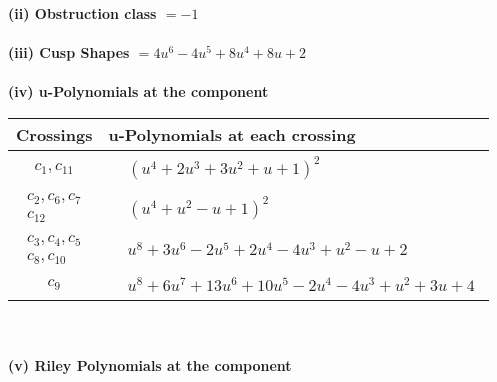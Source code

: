 \documentclass[1p]{elsarticle_modified}
\theoremstyle{definition}
\begin{document}
\flushleft \textbf{(ii) Obstruction class $= -1$}\\~\\
\flushleft \textbf{(iii) Cusp Shapes $= 4 u^6-4 u^5+8 u^4+8 u+2$}\\~\\
\newpage\renewcommand{\arraystretch}{1}
\flushleft \textbf{(iv) u-Polynomials at the component}\newline \\
\begin{tabular}{m{50pt}|m{274pt}}
Crossings & \hspace{64pt}u-Polynomials at each crossing \\
\hline $$\begin{aligned}c_{1},c_{11}\end{aligned}$$&$\begin{aligned}
&(u^4+2 u^3+3 u^2+u+1)^2
\end{aligned}$\\
\hline $$\begin{aligned}c_{2},c_{6},c_{7}\\c_{12}\end{aligned}$$&$\begin{aligned}
&(u^4+u^2- u+1)^2
\end{aligned}$\\
\hline $$\begin{aligned}c_{3},c_{4},c_{5}\\c_{8},c_{10}\end{aligned}$$&$\begin{aligned}
&u^8+3 u^6-2 u^5+2 u^4-4 u^3+u^2- u+2
\end{aligned}$\\
\hline $$\begin{aligned}c_{9}\end{aligned}$$&$\begin{aligned}
&u^8+6 u^7+13 u^6+10 u^5-2 u^4-4 u^3+u^2+3 u+4
\end{aligned}$\\
\hline
\end{tabular}\\~\\
\newpage\renewcommand{\arraystretch}{1}
\flushleft \textbf{(v) Riley Polynomials at the component}\newline \\
\end{document}
